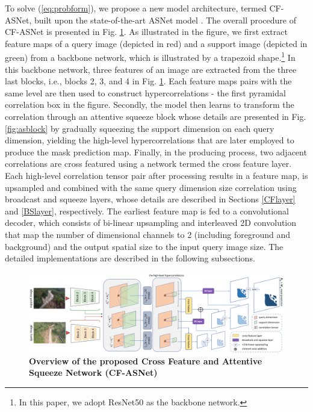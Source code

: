 \documentclass{ieeeaccess}
\begin{document}
To solve (\ref{eq:probform}), we propose a new model architecture, termed CF-ASNet, built upon the state-of-the-art ASNet model \cite{Kang2022}. The overall procedure of CF-ASNet is presented in Fig. \ref{fig:arch}. As illustrated in the figure, we first extract feature maps of a query image (depicted in red) and a support image (depicted in green) from a backbone network, which is illustrated by a trapezoid shape.\footnote{In this paper, we adopt ResNet50 as the backbone network.} In this backbone network, three features of an image are extracted from the three last blocks, i.e., blocks 2, 3, and 4 in Fig. \ref{fig:arch}. Each feature maps pairs with the same level are then used to construct hypercorrelations - the first pyramidal correlation box in the figure. Secondly, the model then learns to transform the correlation through an attentive squeeze block whose details are presented in Fig. \ref{fig:asblock} by gradually squeezing the support dimension on each query dimension, yielding the high-level hypercorrelations that are later employed to produce the mask prediction map. Finally, in the producing process, two adjacent correlations are cross featured using a network termed the cross feature layer. Each high-level correlation tensor pair after processing results in a feature map, is upsampled and combined with the same query dimension size correlation using broadcast and squeeze layers, whose details are described in Sections \ref{CFlayer} and \ref{BSlayer}, respectively. The earliest feature map is fed to a convolutional decoder, which consists of bi-linear upsampling and interleaved 2D convolution that map the number of dimensional channels to 2 (including foreground and background) and the output spatial size to the input query image size. The detailed implementations are described in the following subsections.


    \begin{figure}[t]
        \centering
        \includegraphics[width=\textwidth]{Fig/landslide-model.png}
        \caption{\textbf{Overview of the proposed Cross Feature and Attentive Squeeze Network (CF-ASNet)}}
        \label{fig:arch}
    \end{figure}
\end{document}
